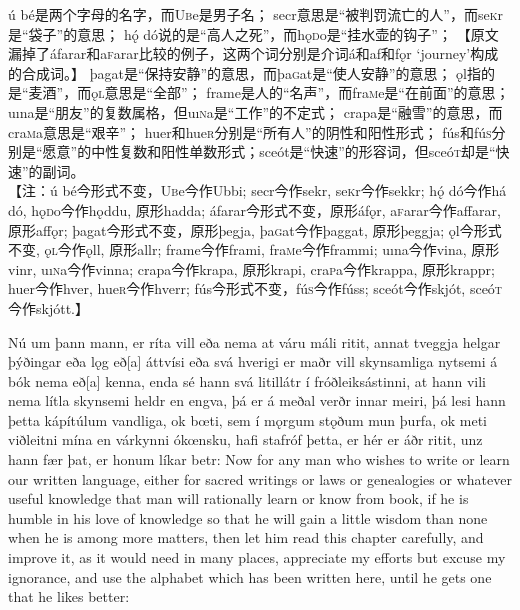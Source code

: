 \begin{translation*}{}
    ú bé是两个字母的名字，而U\textsc{b}e是男子名；
    secr意思是“被判罚流亡的人”，而se\textsc{k}r是“袋子”的意思；
    hǫ́ dó说的是“高人之死”，而hǫ\textsc{d}o是“挂水壶的钩子”；
    【原文漏掉了áfarar和a\textsc{f}arar比较的例子，这两个词分别是介词á和af和fǫr `journey'构成的合成词。】
    þagat是“保持安静”的意思，而þa\textsc{g}at是“使人安静”的意思；
    ǫl指的是“麦酒”，而ǫ\textsc{l}意思是“全部”；
    frame是人的“名声”，而fra\textsc{m}e是“在前面”的意思；
    uına是“朋友”的复数属格，但uı\textsc{n}a是“工作”的不定式；
    crapa是“融雪”的意思，而cra\textsc{m}a意思是“艰辛”； huer和hue\textsc{r}分别是“所有人”的阴性和阳性形式；
    fús和fú\textsc{s}分别是“愿意”的中性复数和阳性单数形式；sceót是“快速”的形容词，但sceó\textsc{t}却是“快速”的副词。\\

    【注：ú bé今形式不变，U\textsc{b}e今作Ubbi;
    secr今作sekr, se\textsc{k}r今作sekkr;
    h\'{ǫ} dó今作há dó, hǫ\textsc{d}o今作hǫddu, 原形hadda;
    áfarar今形式不变，原形áfǫr, a\textsc{f}arar今作affarar, 原形affǫr;
    þagat今形式不变，原形þegja, þa\textsc{g}at今作þaggat, 原形þeggja;
    ǫl今形式不变, ǫ\textsc{l}今作ǫll, 原形allr;
    frame今作frami, fra\textsc{m}e今作frammi;
    uına今作vina, 原形vinr, uı\textsc{n}a今作vinna; crapa今作krapa, 原形krapi, cra\textsc{p}a今作krappa, 原形krappr;
    huer今作hver, hue\textsc{r}今作hverr;
    fús今形式不变，fú\textsc{s}今作fúss;
    sceót今作skjót, sceó\textsc{t}今作skjótt.】
\end{translation*}
\begin{paracol}{2}
    Nú um þann mann, er ríta vill eða nema at váru máli ritit, annat tveggja helgar þýðingar eða lǫg eð[a] áttvísi eða svá hverigi er maðr vill skynsamliga nytsemi á bók nema eð[a] kenna, enda sé hann svá litillátr í fróðleiksástinni, at hann vili nema lítla skynsemi heldr en engva, þá er á meðal verðr innar meiri, þá lesi hann þetta kápítúlum vandliga, ok bœti, sem í mǫrgum stǫðum mun þurfa, ok meti viðleitni mína en várkynni ókœnsku, hafi stafróf þetta, er hér er áðr ritit, unz hann fær þat, er honum líkar betr:
    \switchcolumn
    Now for any man who wishes to write or learn our written language, either for sacred writings or laws or genealogies or whatever useful knowledge that man will rationally learn or know from book, if he is humble in his love of knowledge so that he will gain a little wisdom than none when he is among more matters, then let him read this chapter carefully, and improve it, as it would need in many places, appreciate my efforts but excuse my ignorance, and use the alphabet which has been written here, until he gets one that he likes better:
\end{paracol}
